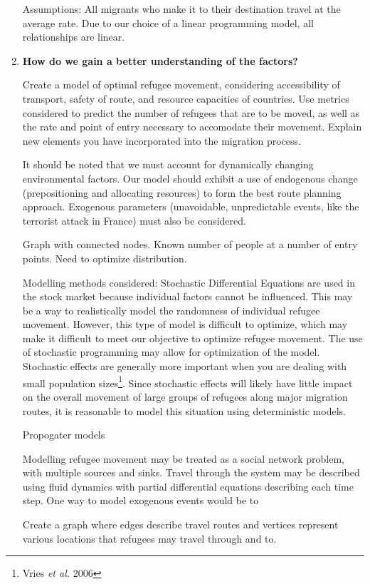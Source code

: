 \documentclass{article}
\begin{document}
\begin{enumerate}
    Assumptions: All migrants who make it to their destination travel at the average rate. Due to our choice of a linear programming model, all relationships are linear. 

    \item {\bf How do we gain a better understanding of the factors?}

    Create a model of optimal refugee movement, considering accessibility of transport, safety of route, and resource capacities of countries. Use metrics considered to predict the number of refugees that are to be moved, as well as the rate and point of entry necessary to accomodate their movement. Explain new elements you have incorporated into the migration process.

    It should be noted that we must account for dynamically changing environmental factors. Our model should exhibit a use of endogenous change (prepositioning and allocating resources) to form the best route planning approach. Exogenous parameters (unavoidable, unpredictable events, like the terrorist attack in France) must also be considered.

    Graph with connected nodes. Known number of people at a number of entry points. Need to optimize distribution.

    Modelling methods considered:
    Stochastic Differential Equations are used in the stock market because individual factors cannot be influenced. This may be a way to realistically model the randomness of individual refugee movement. However, this type of model is difficult to optimize, which may make it difficult to meet our objective to optimize refugee movement. The use of stochastic programming may allow for optimization of the model. Stochastic effects are generally more important when you are dealing with small population sizes\footnote{Vries {\em et al.} 2006}. Since stochastic effects will likely have little impact on the overall movement of large groups of refugees along major migration routes, it is reasonable to model this situation using deterministic models. 

    Propogater models

    Modelling refugee movement may be treated as a social network problem, with multiple sources and sinks. Travel through the system may be described using fluid dynamics with partial differential equations describing each time step. One way to model exogenous events would be to 

    Create a graph where edges describe travel routes and vertices represent various locations that refugees may travel through and to.


\end{enumerate}
\end{document}
